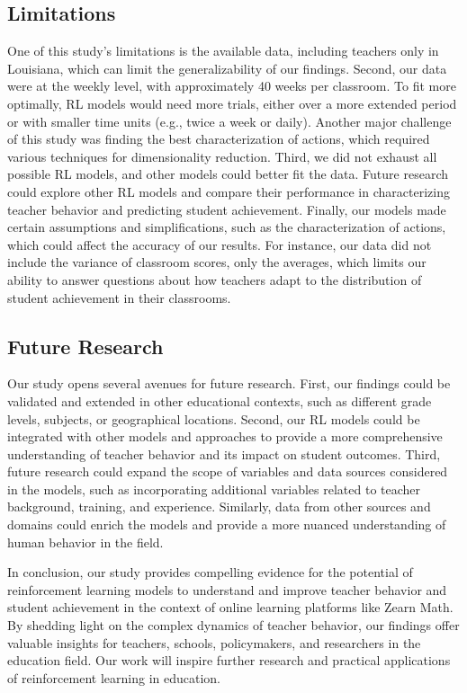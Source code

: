 \documentclass[
  number,
  preprint,
  3p,
  onecolumn]{elsarticle}
\begin{document}
\hypertarget{limitations}{%
\subsection{Limitations}\label{limitations}}

One of this study's limitations is the available data, including
teachers only in Louisiana, which can limit the generalizability of our
findings. Second, our data were at the weekly level, with approximately
40 weeks per classroom. To fit more optimally, RL models would need more
trials, either over a more extended period or with smaller time units
(e.g., twice a week or daily). Another major challenge of this study was
finding the best characterization of actions, which required various
techniques for dimensionality reduction. Third, we did not exhaust all
possible RL models, and other models could better fit the data. Future
research could explore other RL models and compare their performance in
characterizing teacher behavior and predicting student achievement.
Finally, our models made certain assumptions and simplifications, such
as the characterization of actions, which could affect the accuracy of
our results. For instance, our data did not include the variance of
classroom scores, only the averages, which limits our ability to answer
questions about how teachers adapt to the distribution of student
achievement in their classrooms.

\hypertarget{future-research}{%
\subsection{Future Research}\label{future-research}}

Our study opens several avenues for future research. First, our findings
could be validated and extended in other educational contexts, such as
different grade levels, subjects, or geographical locations. Second, our
RL models could be integrated with other models and approaches to
provide a more comprehensive understanding of teacher behavior and its
impact on student outcomes. Third, future research could expand the
scope of variables and data sources considered in the models, such as
incorporating additional variables related to teacher background,
training, and experience. Similarly, data from other sources and domains
could enrich the models and provide a more nuanced understanding of
human behavior in the field.

In conclusion, our study provides compelling evidence for the potential
of reinforcement learning models to understand and improve teacher
behavior and student achievement in the context of online learning
platforms like Zearn Math. By shedding light on the complex dynamics of
teacher behavior, our findings offer valuable insights for teachers,
schools, policymakers, and researchers in the education field. Our work
will inspire further research and practical applications of
reinforcement learning in education.
\end{document}
